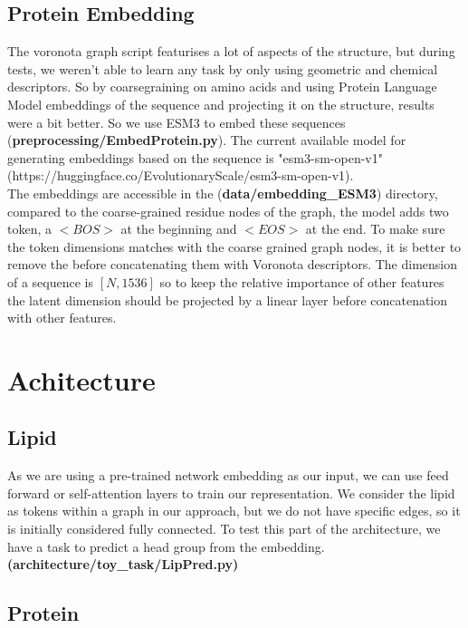 \documentclass{pssbmac}
\begin{document}
\subsection{Protein Embedding}

The voronota graph script featurises a lot of aspects of the structure, but during tests, we weren't able to learn any task by only using geometric and chemical descriptors. So by coarsegraining on amino acids and using Protein Language Model embeddings of the sequence and projecting it on the structure, results were a bit better. So we use ESM3 \cite{esm3} to embed these sequences (\textbf{preprocessing/EmbedProtein.py}). The current available model for generating embeddings based on the sequence is "esm3-sm-open-v1" (https://huggingface.co/EvolutionaryScale/esm3-sm-open-v1).  \\

The embeddings are accessible in the (\textbf{data/embedding\_ESM3}) directory, compared to the coarse-grained residue nodes of the graph, the model adds two token, a $<BOS>$ at the beginning and $<EOS>$ at the end. To make sure the token dimensions matches with the coarse grained graph nodes, it is better to remove the before concatenating them with Voronota descriptors. The dimension of a sequence is $[N,1536]$ so to keep the relative importance of other features the latent dimension should be projected by a linear layer before concatenation with other features.

\section{Achitecture}

\subsection{Lipid}

As we are using a pre-trained network embedding as our input, we can use feed forward or self-attention layers to train our representation. We consider the lipid as tokens within a graph in our approach, but we do not have specific edges, so it is initially considered fully connected. To test this part of the architecture, we have a task to predict a head group from the embedding. \textbf{(architecture/toy\_task/LipPred.py)}

\subsection{Protein}
\end{document}
